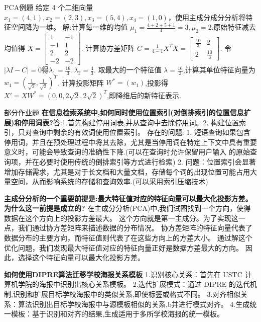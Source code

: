 \documentclass[10pt, utf8]{ctexart}
\begin{document}
\begin{multicols}{4}
    {\color{orange_}PCA例题}
    给定 4 个二维向量 $x_1 = (4,1),x_2 = (2,3),x_3 = (5,4),x_4 = (1,0)$，使用主成分成分分析将特征空间降为一维。
    {\color{blue}解:}计算每一维的均值 $\mu_1 = \frac{4+2+5+1}{4} = 3,\mu_2 = 2$.原始特征减去均值得
    $X = \left[\begin{smallmatrix} 1 & -1 \\ -1 & 1 \\ 2 & 2 \\ -2 & -2 \end{smallmatrix}\right]$.
    计算协方差矩阵 $C = \frac{1}{4-1}X^TX = \left[\begin{smallmatrix} \frac{10}{3} & 2 \\ 2 & \frac{10}{3} \end{smallmatrix}\right]$.
    令 $|\lambda I - C| = 0$得$\lambda_1 = \frac{16}{3},\lambda_2 = \frac{4}{3}$.
    取最大的一个特征值 $\lambda = \frac{16}{3}$,计算其单位特征向量为 $w_1 = (\frac{1}{\sqrt{2}},\frac{1}{\sqrt{2}})^T$.
    计算投影矩阵 $W^* = (w_1)$,投影得 $X' = XW^* = (0,0,2\sqrt{2},2\sqrt{2})^T$,即降维后的新特征表示.

    {\color{orange_}部分作业题}
    \textbf{在信息检索系统中,如何同时使用位置索引(对倒排索引的位置信息扩展)和停用词表?}{\color{blue}答:}1.首先构建停用词表,并从查询中去除停用词。2. 构建位置索引，只对查询中剩余的有效词使用位置索引。
    存在的问题:
    1. 短语查询如果包含停用词，并且在预处理过程中将其去除，尤其是当停用词在特定上下文中具有重要意义时，可能会导致查询的准确性下降.(可以在查询时允许保留用户输入
    的原始查询项，并在必要时使用传统的倒排索引等方式进行检索)
    2. 问题：位置索引会显著增加存储需求，尤其是对于长文档和大量文档，存储每个词的出现位置可能占用大量空间，从而影响系统的存储和查询效率.(可以采用索引压缩技术)
    
    \textbf{主成分分析的一个重要前提是:最大特征值对应的特征向量可以最大化投影方差。为什么这一前提是成立的?}
    在主成分分析(PCA)中,我们试图找到一个方向，使得数据在这个方向上的投影方差最大。
    这个方向就是第一主成分。为了实现这一点，我们通过协方差矩阵来描述数据的分布情况。
    协方差矩阵的特征向量代表了数据分布的主要方向，⽽特征值则代表了在这些方向上的方差大小。
    通过解这个优化问题，我们发现最大特征值对应的特征向量正好是数据方差最大的方向。
    因此，选择这个特征向量可以最大化投影方差。

    \textbf{如何使用DIPRE算法迁移学校海报关系模板}
    1.识别核心关系：首先在 USTC 计算机学院的海报中识别出核心关系模板。
    2.迭代扩展模式：通过 DIPRE 的迭代机制,识别和扩展目标学校海报中的类似关系,即使标签或格式不同。
    3.对齐相似关系：算法识别出目标学校海报中与源模板相似的关系,b并进行模式对齐。
    4.生成统一模板：基于识别和对齐的结果,生成适用于多所学校海报的统一模板。


\end{multicols}

\clearpage

\begin{multicols}{6}

\end{multicols}
\end{document}
